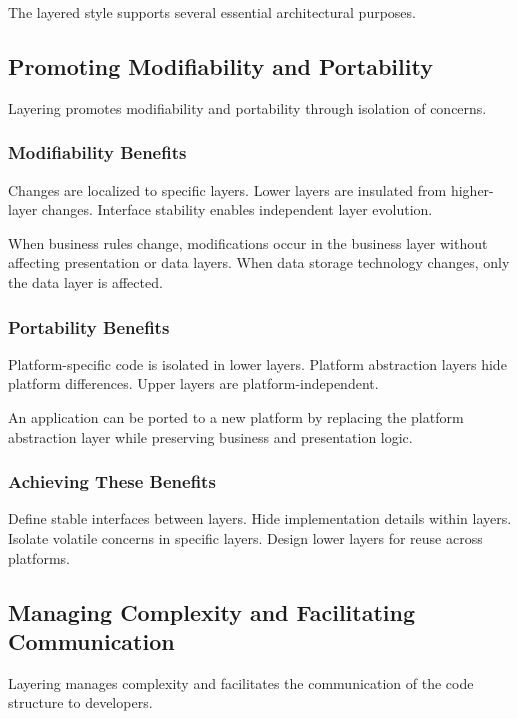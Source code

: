 \documentclass[11pt]{article}
\begin{document}
The layered style supports several essential architectural purposes.

\subsection{Promoting Modifiability and Portability}

Layering promotes modifiability and portability through isolation of concerns.

\subsubsection{Modifiability Benefits}

Changes are localized to specific layers. Lower layers are insulated from higher-layer changes. Interface stability enables independent layer evolution.

When business rules change, modifications occur in the business layer without affecting presentation or data layers. When data storage technology changes, only the data layer is affected.

\subsubsection{Portability Benefits}

Platform-specific code is isolated in lower layers. Platform abstraction layers hide platform differences. Upper layers are platform-independent.

An application can be ported to a new platform by replacing the platform abstraction layer while preserving business and presentation logic.

\subsubsection{Achieving These Benefits}

Define stable interfaces between layers. Hide implementation details within layers. Isolate volatile concerns in specific layers. Design lower layers for reuse across platforms.

\subsection{Managing Complexity and Facilitating Communication}

Layering manages complexity and facilitates the communication of the code structure to developers.
\end{document}
